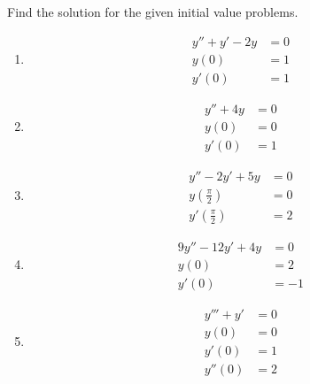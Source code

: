 \documentclass[fleqn, a4paper, 11pt, oneside]{amsart}
\theoremstyle{definition}
\theoremstyle{theorem}
\begin{document}
\begin{question}
	Find the solution for the given initial value problems.
	\begin{enumerate}
		\item
			\begin{align*}
				y'' + y' − 2 y &= 0\\
				y(0) &= 1\\
				y'(0) &= 1
			\end{align*}
		\item
			\begin{align*}
				y'' + 4 y &= 0\\
				y(0) &= 0\\
				y'(0) &= 1
			\end{align*}
		\item
			\begin{align*}
				y'' - 2 y' + 5 y &= 0\\
				y\left( \frac{\pi}{2} \right) &= 0\\
				y'\left( \frac{\pi}{2} \right) &= 2
			\end{align*}
		\item
			\begin{align*}
				9 y'' - 12 y' + 4 y &= 0\\
				y(0) &= 2\\
				y'(0) &= -1
			\end{align*}
		\item
			\begin{align*}
				y''' + y' &= 0\\
				y(0) &= 0\\
				y'(0) &= 1\\
				y''(0) &= 2
			\end{align*}
	\end{enumerate}
\end{question}
\end{document}
